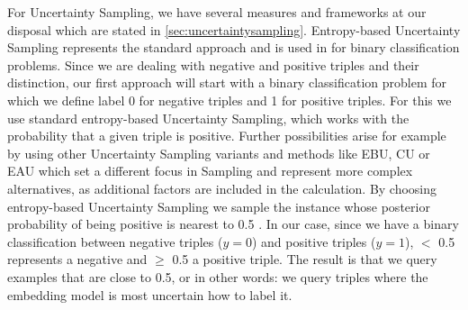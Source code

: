 For Uncertainty Sampling, we have several measures and frameworks at our disposal which are stated in \autoref{sec:uncertaintysampling}.
Entropy-based Uncertainty Sampling represents the standard approach and is used in for binary classification problems.
Since we are dealing with negative and positive triples and their distinction, our first approach will start with a binary classification problem for which we define label 0 for negative triples and 1 for positive triples.
For this we use standard entropy-based Uncertainty Sampling, which works with the probability that a given triple is positive. 
Further possibilities arise for example by using other Uncertainty Sampling variants and methods like \ac{EBU}, \ac{CU} or \ac{EAU} which set a different focus in Sampling and represent more complex alternatives, as additional factors are included in the calculation.
By choosing entropy-based Uncertainty Sampling we sample the instance whose posterior probability of being positive is nearest to 0.5 \cite{Settles2009ActiveLL}.
In our case, since we have a binary classification between negative triples ($y=0$) and positive triples ($y=1$), $<$ 0.5 represents a negative and $\geq$ 0.5 a positive triple.
The result is that we query examples that are close to 0.5, or in other words: 
we query triples where the embedding model is most uncertain how to label it.

